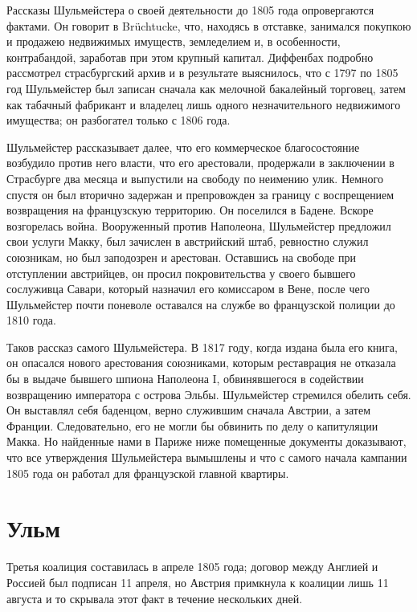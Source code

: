 \documentclass[
  oneside,
  12pt,
  titlepage]{book}
\begin{document}
Рассказы Шульмейстера о своей деятельности до 1805 года опровергаются фактами. Он говорит в Brüchtucke, что, находясь в отставке, занимался покупкою и продажею недвижимых имуществ, земледелием и, в особенности, контрабандой, заработав при этом крупный капитал. Диффенбах подробно рассмотрел страсбургский архив и в результате выяснилось, что с 1797 по 1805 год Шульмейстер был записан сначала как мелочной бакалейный торговец, затем как табачный фабрикант и владелец лишь одного незначительного недвижимого имущества; он разбогател только с 1806 года.

Шульмейстер рассказывает далее, что его коммерческое благосостояние возбудило против него власти, что его арестовали, продержали в заключении в Страсбурге два месяца и выпустили на свободу по неимению улик. Немного спустя он был вторично задержан и препровожден за границу с воспрещением возвращения на французскую территорию. Он поселился в Бадене. Вскоре возгорелась война. Вооруженный против Наполеона, Шульмейстер предложил свои услуги Макку, был зачислен в австрийский штаб, ревностно служил союзникам, но был заподозрен и арестован. Оставшись на свободе при отступлении австрийцев, он просил покровительства у своего бывшего сослуживца Савари, который назначил его комиссаром в Вене, после чего Шульмейстер почти поневоле оставался на службе во французской полиции до 1810 года.

Таков рассказ самого Шульмейстера. В 1817 году, когда издана была его книга, он опасался нового арестования союзниками, которым реставрация не отказала бы в выдаче бывшего шпиона Наполеона I, обвинявшегося в содействии возвращению императора с острова Эльбы. Шульмейстер стремился обелить себя. Он выставлял себя баденцом, верно служившим сначала Австрии, а затем Франции. Следовательно, его не могли бы обвинить по делу о капитуляции Макка. Но найденные нами в Париже ниже помещенные документы доказывают, что все утверждения Шульмейстера вымышлены и что с самого начала кампании 1805 года он работал для французской главной квартиры.

\hypertarget{ux443ux43bux44cux43c}{%
\chapter{Ульм}\label{ux443ux43bux44cux43c}}

Третья коалиция составилась в апреле 1805 года; договор между Англией и Россией был подписан 11 апреля, но Австрия примкнула к коалиции лишь 11 августа и то скрывала этот факт в течение нескольких дней.
\end{document}
